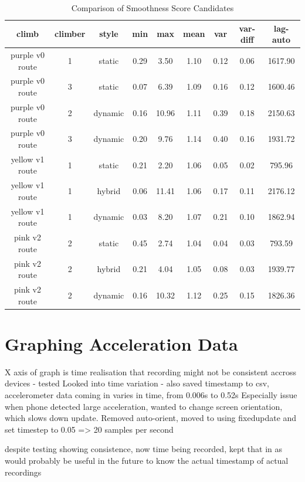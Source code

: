 \begin{table}[h]
\centering
\begin{tabular}{|c|c|c|c|c|c|c|c|c|}
\hline
climb  &  climber & style & min & max & mean & var & var-diff & lag-auto \\ \hline
purple v0 route & 1 & static  & 0.29 & 3.50 & 1.10 & 0.12 & 0.06 & 1617.90 \\ \hline
purple v0 route & 3 & static  & 0.07 & 6.39 & 1.09 & 0.16 & 0.12 & 1600.46 \\ \hline
purple v0 route & 2 & dynamic & 0.16 & 10.96 & 1.11 & 0.39 & 0.18 & 2150.63 \\ \hline
purple v0 route & 3 & dynamic & 0.20 & 9.76 & 1.14 & 0.40 & 0.16 & 1931.72 \\ \hline
yellow v1 route & 1 & static  & 0.21 & 2.20 & 1.06 & 0.05 & 0.02 & 795.96 \\ \hline
yellow v1 route & 1 & hybrid & 0.06 & 11.41 & 1.06 & 0.17 & 0.11 & 2176.12 \\ \hline
yellow v1 route & 1 & dynamic & 0.03 & 8.20 & 1.07 & 0.21 & 0.10 & 1862.94 \\ \hline
pink v2 route & 2 & static & 0.45 & 2.74 & 1.04 & 0.04 & 0.03 & 793.59 \\ \hline
pink v2 route & 2 & hybrid & 0.21 & 4.04 & 1.05 & 0.08 & 0.03 & 1939.77 \\ \hline
pink v2 route & 2 & dynamic & 0.16 & 10.32 & 1.12 & 0.25 & 0.15 & 1826.36 \\ \hline

\end{tabular}
\caption{Comparison of Smoothness Score Candidates}
\label{tab:smooth}
\end{table}


\section{Graphing Acceleration Data}
X axis of graph is time
realisation that recording might not be consistent accross devices - tested 
Looked into time variation - also saved timestamp to csv, accelerometer data coming in varies in time, from 0.006s to 0.52s 
Especially issue when phone detected large acceleration, wanted to change screen orientation, which slows down update.
Removed auto-orient,  moved to using fixedupdate and set timestep to 0.05 => 20 samples per second

despite testing showing consistence, now time being recorded, kept that in as would probably be useful in the future to know the actual timestamp of actual recordings



